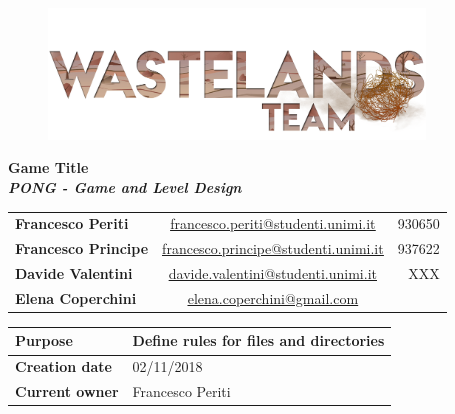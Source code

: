 \documentclass[12pt]{article}
\begin{document}
\begin{center}
  \begin{figure}[H]
  \centering
  \vspace*{5\baselineskip}
  \includegraphics[width=10cm]{Images/Logos/logoTeam}
  \end{figure}

  \vspace{50pt}
  {\huge \textbf{Game Title}} \\
  {\large \textbf{ \textit{PONG - Game and Level Design}}}
\end{center}

\vspace{20pt}
\begin{table}[H]
  \centering
  \begin{tabular}{lcr}
    \textbf{Francesco Periti}	& \underline{\href{mailto:francesco.periti@studenti.unimi.it}{francesco.periti@studenti.unimi.it}}	& 930650 \\
    \textbf{Francesco Principe}	& \underline{\href{mailto:francesco.principe@studenti.unimi.it}{francesco.principe@studenti.unimi.it}}	& 937622 \\
    \textbf{Davide Valentini}	& \underline{\href{mailto:davide.valentini@studenti.unimi.it}{davide.valentini@studenti.unimi.it}}	& XXX \\
    \textbf{Elena Coperchini}	& \underline{\href{mailto:elena.coperchini@gmail.com}{elena.coperchini@gmail.com}}			& \\
  \end{tabular}
\end{table}


  \vspace{10pt}
\begin{table}[H]
  \centering
  \begin{tabular}{|l|l|}
    \hline
    \cellcolor{lightgray}\textbf{Purpose} &  Define rules for files and directories \\\hline
    \cellcolor{lightgray}\textbf{Creation date} & 02/11/2018 \\\hline
    \cellcolor{lightgray}\textbf{Current owner} & Francesco Periti \\\hline
  \end{tabular}
\end{table}
\end{document}
